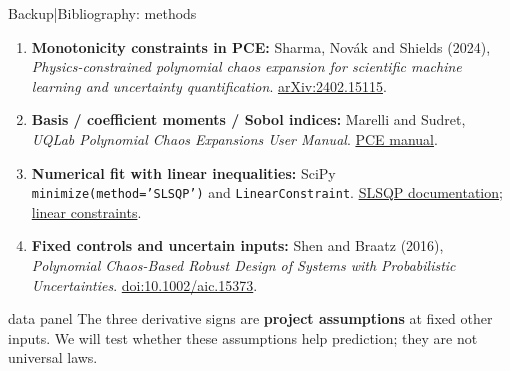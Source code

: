 \begin{frame}{Backup\enspace|\enspace Bibliography: methods}
  \footnotesize
  \begin{enumerate}
    \setlength{\itemsep}{3mm}
    \item \textbf{Monotonicity constraints in PCE:}
      Sharma, Nov\'ak and Shields (2024), \emph{Physics-constrained polynomial chaos expansion
      for scientific machine learning and uncertainty quantification}.
      \href{https://arxiv.org/abs/2402.15115}{arXiv:2402.15115}.
    \item \textbf{Basis / coefficient moments / Sobol indices:}
      Marelli and Sudret, \emph{UQLab Polynomial Chaos Expansions User Manual}.
      \href{https://www.uqlab.com/pce-user-manual}{PCE manual}.
    \item \textbf{Numerical fit with linear inequalities:}
      SciPy \texttt{minimize(method='SLSQP')} and \texttt{LinearConstraint}.
      \href{https://docs.scipy.org/doc/scipy/reference/optimize.minimize-slsqp.html}{SLSQP documentation};
      \href{https://docs.scipy.org/doc/scipy/reference/generated/scipy.optimize.LinearConstraint.html}{linear constraints}.
    \item \textbf{Fixed controls and uncertain inputs:}
      Shen and Braatz (2016), \emph{Polynomial Chaos-Based Robust Design of Systems with Probabilistic Uncertainties}.
      \href{https://doi.org/10.1002/aic.15373}{doi:10.1002/aic.15373}.
  \end{enumerate}
  \begin{beamercolorbox}[sep=1.5mm,wd=\textwidth]{data panel}
    The three derivative signs are \textbf{project assumptions} at fixed other inputs.
    We will test whether these assumptions help prediction; they are not universal laws.
  \end{beamercolorbox}
\end{frame}

